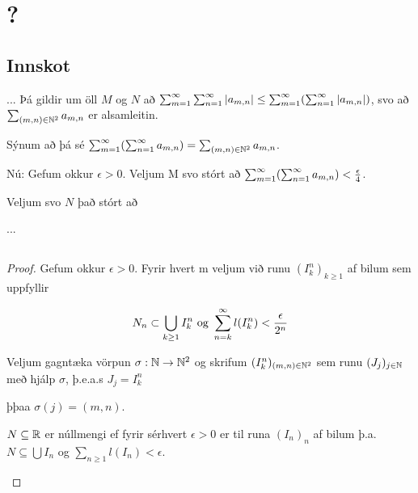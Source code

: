 \documentclass[12pt]{book}
\begin{document}
\chapter{?}

\section*{Innskot}

{

\def\mn{(m,n)}
\def\amn{a_{m,n}}
\def\summn{\sum_{\mn \in \N^2}}

... %
Þá gildir um öll $M$ og $N$ að $\sum_{m=1}^{\infty} \sum_{n=1}^{\infty} \abs{\amn} \leq \summinfty (\sumoinfty \abs{\amn})$, svo að $\sum_{\mn \in \N^2} \amn$ er alsamleitin.

Sýnum að þá sé $\summinfty ( \sumoinfty \amn ) = \summn \amn$.

Nú: Gefum okkur $\epsilon > 0$. Veljum M svo stórt að $\summinfty ( \sumoinfty \amn ) < \eps{4}$.

Veljum svo $N$ það stórt að

... %


}

\section{}

\subsection{}
\begin{proof}

Gefum okkur $\epsilon > 0$. Fyrir hvert m veljum við runu $(I^n_k)_{k \geq 1}$ af bilum sem uppfyllir

\[N_n \subset \bigcup_{k \geq 1} I_k^n \text{ og } \sum_{n = {k}}^{\infty} l(I^n_k) < \frac{\epsilon}{2^n}\]

Veljum gagntæka vörpun $\sigma: \mathbb{N} \to \mathbb{N}^2$ og skrifum $(I^n_k)_{(m,n) \in \mathbb{N}^2}$ sem runu
$(J_j)_{j \in \mathbb{N}}$ með hjálp $\sigma$, þ.e.a.s $J_j = I^n_k$

þþaa $\sigma (j) = (m,n)$.

\begin{ath}
$N \subseteq \mathbb{R}$ er núllmengi ef fyrir sérhvert $\epsilon > 0$ er til runa $(I_n)_{n}$ af bilum þ.a.
$N \subseteq \bigcup I_n$ og $\sum_{n \geq 1} l(I_n) < \epsilon$.

\end{ath}
\end{proof}
\end{document}
